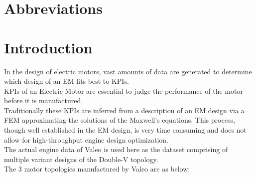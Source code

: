 \documentclass{report} %
\begin{document}
\begin{spacing}{1.2}
    \tableofcontents
\end{spacing}

\newpage

\newpage

\chapter*{Abbreviations}
\begin{acronym}[TDMA]
  

\end{acronym}


\newpage

\newpage

\chapter*{Introduction} 
In the design of electric motors, vast amounts of data are generated to determine which design of an \ac{EM} fits best to \ac{KPI}s. \\
\ac{KPI}s of an Electric Motor are essential to judge the performance of the motor before it is manufactured. \\
Traditionally these \ac{KPI}s are inferred from a description of an \ac{EM} design via a \ac{FEM} approximating the solutions of the Maxwell’s equations. This process, though well established in the \ac{EM} design, is very time consuming and does not allow for high-throughput engine design optimization. \\
The actual engine data of Valeo is used here as the dataset comprising of multiple variant designs of the Double-V topology.\\
The 3 motor topologies manufactured by Valeo are as below:
\end{document}
